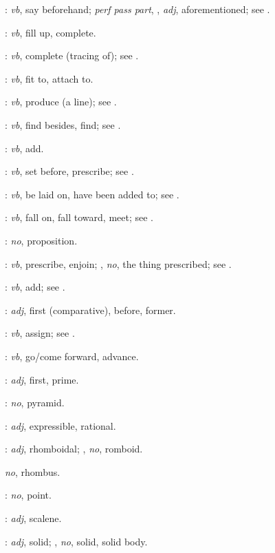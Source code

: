 {\begin{description}
\item[]: {\em vb}, say beforehand; 
{\em perf pass part}, , {\em adj}, aforementioned;
see .
\item[]: {\em vb}, fill up, complete.
\item[]: {\em vb}, complete (tracing of); see .
\item[]: {\em vb}, fit to, attach to.
\item[]: {\em vb}, produce (a line); see .
\item[]: {\em vb}, find besides, find; see .
\item[]: {\em vb}, add.
\item[]: {\em vb}, set before, prescribe; see .
\item[]: {\em vb}, be laid on, have been added to; see .
\item[]: {\em vb}, fall on, fall toward, meet; see .
\item[]: {\em no}, proposition.
\item[]: {\em vb}, prescribe, enjoin; , {\em no}, the thing prescribed; see .
\item[]: {\em vb}, add; see .
\item[]: {\em adj}, first (comparative), before, former.
\item[]: {\em vb}, assign; see .
\item[]: {\em vb}, go/come forward, advance.
\item[]: {\em adj}, first, prime.
\item[]: {\em no}, pyramid.
\item[]: {\em adj}, expressible, rational.
\item[]: {\em adj}, rhomboidal; ,
{\em no}, romboid.
\item[] {\em no}, rhombus.
\item[]: {\em no}, point.
\item[]: {\em adj}, scalene.
\item[]: {\em adj}, solid; , {\em no}, solid, solid body.

\end{description}}
